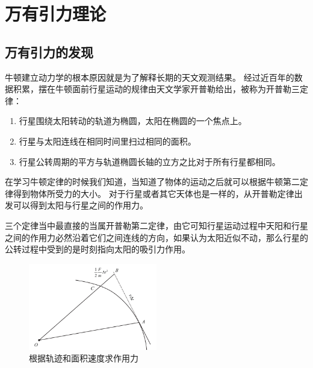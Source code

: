 
\chapter{万有引力理论}

\section{万有引力的发现}
牛顿建立动力学的根本原因就是为了解释长期的天文观测结果。
经过近百年的数据积累，摆在牛顿面前行星运动的规律由天文学家开普勒给出，被称为开普勒三定律：
\begin{enumerate}
\item 行星围绕太阳转动的轨道为椭圆，太阳在椭圆的一个焦点上。
\item 行星与太阳连线在相同时间里扫过相同的面积。
\item 行星公转周期的平方与轨道椭圆长轴的立方之比对于所有行星都相同。
\end{enumerate}
在学习牛顿定律的时候我们知道，当知道了物体的运动之后就可以根据牛顿第二定律得到物体所受力的大小。
对于行星或者其它天体也是一样的，从开普勒定律出发可以得到太阳与行星之间的作用力。

三个定律当中最直接的当属开普勒第二定律，由它可知行星运动过程中天阳和行星之间的作用力必然沿着它们之间连线的方向，如果认为太阳近似不动，那么行星的公转过程中受到的是时刻指向太阳的吸引力作用。

\begin{figure}
\begin{center}
\includegraphics[width=0.5\textwidth]{images/gravity-1.pdf}
\caption{根据轨迹和面积速度求作用力}
\label{fig: 根据轨迹和面积速度求作用力}
\end{center}
\end{figure}

